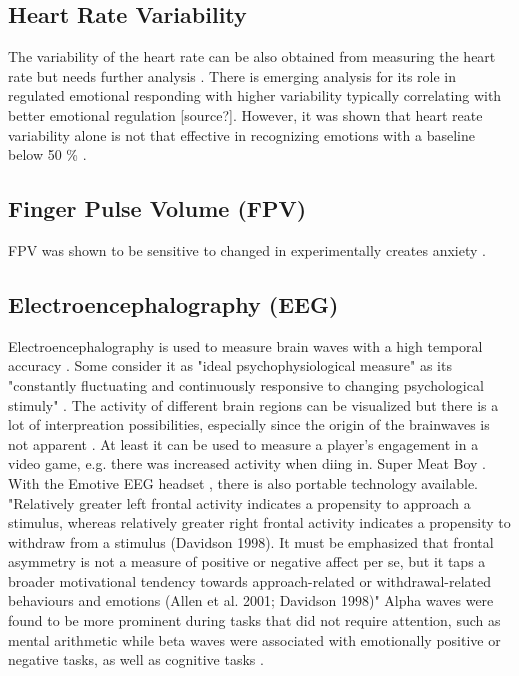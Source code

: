 \subsection{Heart Rate Variability}
The variability of the heart rate can be also obtained from measuring the heart rate but needs further analysis \cite{nacke2015physiological}. There is emerging analysis for its role in regulated emotional responding \cite{appelhans2006heat} with higher variability typically correlating with better emotional regulation [source?]. However, it was shown that heart reate variability alone is not that effective in recognizing emotions with a baseline below 50 \% \cite{ferdinando2014emotion}.


\subsection{Finger Pulse Volume (FPV)}
FPV was shown to be sensitive to changed in experimentally creates anxiety \cite{bloom77finger}.

\subsection{Electroencephalography (EEG)}
Electroencephalography is used to measure brain waves with a high temporal accuracy \cite{nacke2015physiological}. Some consider it as "ideal psychophysiological measure" as its "constantly fluctuating and continuously responsive to changing psychological stimuly" \cite{hatfield87psychophysiology}. The activity of different brain regions can be visualized but there is a lot of interpreation possibilities, especially since the origin of the brainwaves is not apparent \cite{nacke2015physiological}. At least it can be used to measure a player's engagement in a video game, e.g. there was increased activity when diing in. Super Meat Boy \cite{mcmahan2018evaluating}. With the Emotive EEG headset \cite{link_emotiv}, there is also portable technology available.
"Relatively greater left frontal activity indicates a propensity to approach a stimulus, whereas relatively greater right frontal activity indicates a propensity to withdraw from a stimulus (Davidson 1998). It must be emphasized that
frontal asymmetry is not a measure of positive or negative affect per se, but it taps a broader motivational tendency towards approach-related or withdrawal-related behaviours and emotions (Allen et al. 2001; Davidson 1998)" \cite{kivikangas2011review}
Alpha waves were found to be more prominent during tasks that did not require attention, such as mental arithmetic while beta waves were associated with emotionally positive or negative tasks, as well as cognitive tasks \cite{ray85eeg}.


